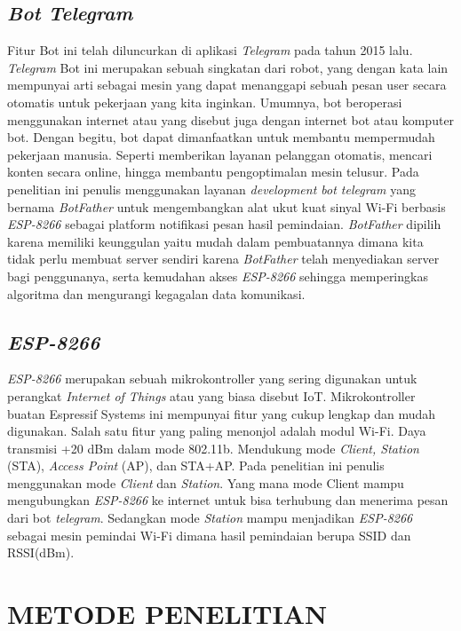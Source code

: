 \documentclass[conference]{IEEEtran}
\begin{document}
\subsection{\textit{Bot Telegram}}
Fitur Bot ini telah diluncurkan di aplikasi \textit{Telegram} pada tahun 2015 lalu.
\textit{Telegram} Bot ini merupakan sebuah singkatan dari robot, yang dengan kata lain mempunyai arti sebagai mesin yang dapat menanggapi sebuah pesan user secara otomatis untuk pekerjaan yang kita inginkan. Umumnya, bot beroperasi menggunakan internet atau yang disebut juga dengan internet bot atau komputer bot. Dengan begitu, bot dapat dimanfaatkan untuk membantu mempermudah pekerjaan manusia. Seperti memberikan layanan pelanggan otomatis, mencari konten secara online, hingga membantu pengoptimalan mesin telusur. Pada penelitian ini penulis menggunakan layanan \textit{development bot telegram} yang bernama \textit{BotFather} untuk mengembangkan alat ukut kuat sinyal Wi-Fi berbasis \textit{ESP-8266} sebagai platform notifikasi pesan hasil pemindaian. \textit{BotFather} dipilih karena memiliki keunggulan yaitu mudah dalam pembuatannya dimana kita tidak perlu membuat server sendiri karena \textit{BotFather} telah menyediakan server bagi penggunanya, serta kemudahan akses \textit{ESP-8266} sehingga memperingkas algoritma dan mengurangi kegagalan data komunikasi.

\subsection{\textit{ESP-8266}}
\textit{ESP-8266} merupakan sebuah mikrokontroller yang sering digunakan untuk
perangkat \textit{Internet of Things} atau yang biasa disebut IoT. Mikrokontroller buatan Espressif Systems ini mempunyai fitur yang cukup lengkap dan mudah
digunakan. Salah satu fitur yang paling menonjol adalah modul Wi-Fi. Daya
transmisi +20 dBm dalam mode 802.11b. Mendukung mode \textit{Client, Station} (STA), \textit{Access Point} (AP), dan STA+AP. Pada penelitian ini penulis menggunakan mode \textit{Client} dan \textit{Station}. Yang mana mode Client mampu mengubungkan \textit{ESP-8266} ke internet untuk bisa terhubung dan menerima pesan
dari bot \textit{telegram}. Sedangkan mode \textit{Station} mampu menjadikan \textit{ESP-8266} sebagai mesin pemindai Wi-Fi dimana hasil pemindaian berupa SSID dan RSSI(dBm).

\section{METODE PENELITIAN}
\end{document}

